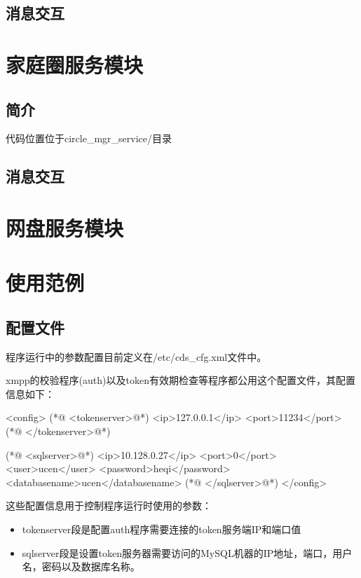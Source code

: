 \documentclass[a4paper]{article}
\begin{document}
  \subsection{消息交互}
    
\section{家庭圈服务模块}
  \subsection{简介}
代码位置位于circle\_mgr\_service/目录

  \subsection{消息交互}
  
\section{网盘服务模块}
    
\section{使用范例}
  \subsection{配置文件}
程序运行中的参数配置目前定义在/etc/cds\_cfg.xml文件中。

xmpp的校验程序(auth)以及token有效期检查等程序都公用这个配置文件，其配置信息如下：
\begin{myjavacode}[numbers=none]
<config>
  (*@ \colorbox{mygreen}{<tokenserver>}@*)
    <ip>127.0.0.1</ip>
    <port>11234</port>
  (*@ \colorbox{mygreen}{</tokenserver>}@*)
  
  (*@ \colorbox{mygreen}{<sqlserver>}@*)
    <ip>10.128.0.27</ip>
    <port>0</port>
    <user>ucen</user>
    <password>heqi</password>
    <databasename>ucen</databasename>
  (*@ \colorbox{mygreen}{</sqlserver>}@*)
</config>
\end{myjavacode}

这些配置信息用于控制程序运行时使用的参数：
\begin{itemize}
\item \colorbox{mygreen}{tokenserver}段是配置auth程序需要连接的token服务端IP和端口值
\item \colorbox{mygreen}{sqlserver}段是设置token服务器需要访问的MySQL机器的IP地址，端口，用户名，密码以及数据库名称。
\end{itemize}
\end{document}
